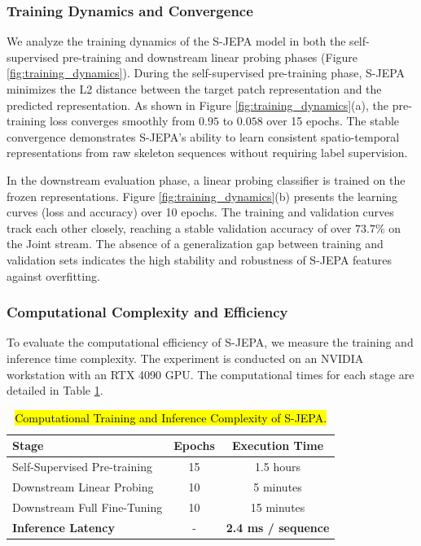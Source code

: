 \documentclass[conference]{IEEEtran}
\newenvironment{newcontent}{\begin{mdframed}[style=newstyle]}{\end{mdframed}}
\begin{document}
\begin{newcontent}
\subsubsection{Training Dynamics and Convergence}
We analyze the training dynamics of the S-JEPA model in both the self-supervised pre-training and downstream linear probing phases (Figure \ref{fig:training_dynamics}). During the self-supervised pre-training phase, S-JEPA minimizes the L2 distance between the target patch representation and the predicted representation. As shown in Figure \ref{fig:training_dynamics}(a), the pre-training loss converges smoothly from $0.95$ to $0.058$ over 15 epochs. The stable convergence demonstrates S-JEPA's ability to learn consistent spatio-temporal representations from raw skeleton sequences without requiring label supervision.
\end{newcontent}



\begin{newcontent}
In the downstream evaluation phase, a linear probing classifier is trained on the frozen representations. Figure \ref{fig:training_dynamics}(b) presents the learning curves (loss and accuracy) over 10 epochs. The training and validation curves track each other closely, reaching a stable validation accuracy of over $73.7\%$ on the Joint stream. The absence of a generalization gap between training and validation sets indicates the high stability and robustness of S-JEPA features against overfitting.
\end{newcontent}

\begin{newcontent}
\subsubsection{Computational Complexity and Efficiency}
To evaluate the computational efficiency of S-JEPA, we measure the training and inference time complexity. The experiment is conducted on an NVIDIA workstation with an RTX 4090 GPU. The computational times for each stage are detailed in Table \ref{tab:comp_time}.
\end{newcontent}

\begin{table}[htbp]
\centering
\caption[Computational Complexity of S-JEPA.]{\hl{Computational Training and Inference Complexity of S-JEPA.}}
\label{tab:comp_time}
\begin{tabular}{lcc}
\toprule
\textbf{Stage} & \textbf{Epochs} & \textbf{Execution Time} \\
\midrule
Self-Supervised Pre-training & 15 & 1.5 hours \\
Downstream Linear Probing & 10 & 5 minutes \\
Downstream Full Fine-Tuning & 10 & 15 minutes \\
\midrule
\textbf{Inference Latency} & - & \textbf{2.4 ms / sequence} \\
\bottomrule
\end{tabular}
\end{table}
\end{document}
